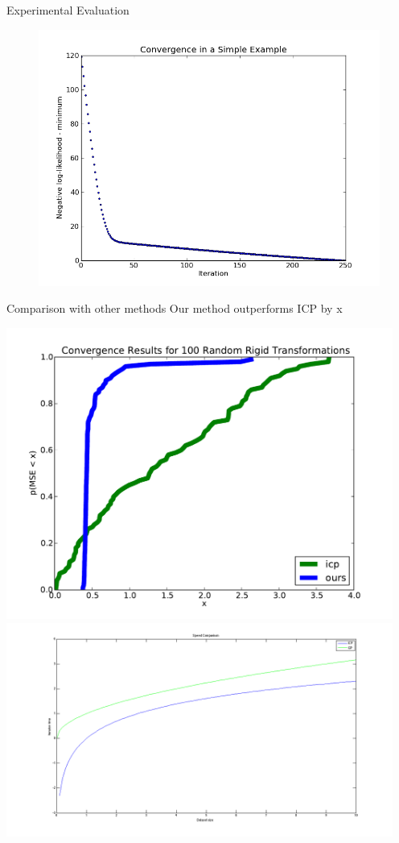 \documentclass[final]{beamer}
\begin{document}
\begin{frame}{}
\begin{textblock}{27}
\begin{block}{Experimental Evaluation}
\begin{figure}
\includegraphics[width=8in]{likelihood.png}
\end{figure}
\end{block}


\begin{block}{Comparison with other methods}
Our method outperforms ICP by x%

\includegraphics[width=5in]{convergence.pdf}
\includegraphics[width=5in]{SpeedComparison.png}
\end{block}


\end{textblock}
\end{frame}
\end{document}
